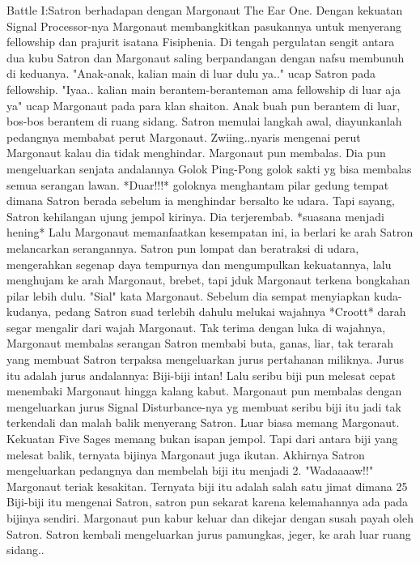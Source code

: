\documentclass[a4paper,11pt,final]{article}
\begin{document}
Battle I:Satron berhadapan dengan Margonaut The Ear One.
Dengan kekuatan Signal Processor-nya Margonaut membangkitkan pasukannya untuk menyerang fellowship dan prajurit isatana Fisiphenia. Di tengah pergulatan sengit antara dua kubu Satron dan Margonaut saling berpandangan dengan nafsu membunuh di keduanya.
"Anak-anak, kalian main di luar dulu ya.." ucap Satron pada fellowship. "Iyaa.. kalian main berantem-beranteman ama fellowship di luar aja ya" ucap Margonaut pada para klan shaiton. Anak buah pun berantem di luar, bos-bos berantem di ruang sidang.
Satron memulai langkah awal, diayunkanlah pedangnya membabat perut Margonaut. Zwiing..nyaris mengenai perut Margonaut kalau dia tidak menghindar. Margonaut pun membalas.
Dia pun mengeluarkan senjata andalannya Golok Ping-Pong golok sakti yg bisa membalas semua serangan lawan. *Duar!!!* goloknya menghantam pilar gedung tempat dimana Satron berada sebelum ia menghindar bersalto ke udara.
Tapi sayang, Satron kehilangan ujung jempol kirinya. Dia terjerembab. *suasana menjadi hening* Lalu Margonaut memanfaatkan kesempatan ini, ia berlari ke arah Satron melancarkan serangannya.
Satron pun lompat dan beratraksi di udara, mengerahkan segenap daya tempurnya dan mengumpulkan kekuatannya, lalu menghujam ke arah Margonaut, brebet, tapi jduk Margonaut terkena bongkahan pilar lebih dulu. "Sial" kata Margonaut.
Sebelum dia sempat menyiapkan kuda-kudanya, pedang Satron suad terlebih dahulu melukai wajahnya *Croott* darah segar mengalir dari wajah Margonaut.
Tak terima dengan luka di wajahnya, Margonaut membalas serangan Satron membabi buta, ganas, liar, tak terarah yang membuat Satron terpaksa mengeluarkan jurus pertahanan miliknya.
Jurus itu adalah jurus andalannya: Biji-biji intan! Lalu seribu biji pun melesat cepat menembaki Margonaut hingga kalang kabut.
Margonaut pun membalas dengan mengeluarkan jurus Signal Disturbance-nya yg membuat seribu biji itu jadi tak terkendali dan malah balik menyerang Satron. Luar biasa memang Margonaut. Kekuatan Five Sages memang bukan isapan jempol.
Tapi dari antara biji yang melesat balik, ternyata bijinya Margonaut juga ikutan. Akhirnya Satron mengeluarkan pedangnya dan membelah biji itu menjadi 2. "Wadaaaaw!!" Margonaut teriak kesakitan.
Ternyata biji itu adalah salah satu jimat dimana 25%
Biji-biji itu mengenai Satron, satron pun sekarat karena kelemahannya ada pada bijinya sendiri. Margonaut pun kabur keluar dan dikejar dengan susah payah oleh Satron. Satron kembali mengeluarkan jurus pamungkas, jeger, ke arah luar ruang sidang..
\end{document}
